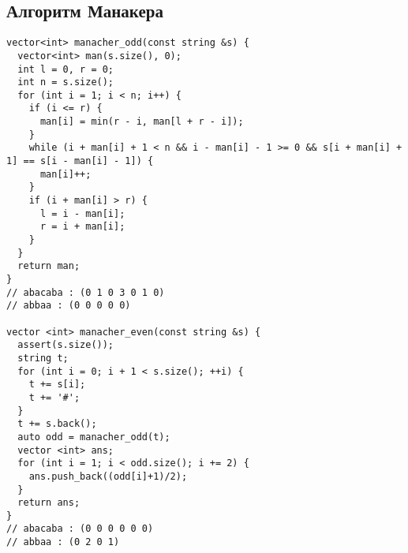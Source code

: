 \subsection{Алгоритм Манакера}
\begin{lstlisting}
vector<int> manacher_odd(const string &s) {
  vector<int> man(s.size(), 0);
  int l = 0, r = 0;
  int n = s.size();
  for (int i = 1; i < n; i++) {
    if (i <= r) {
      man[i] = min(r - i, man[l + r - i]);
    }
    while (i + man[i] + 1 < n && i - man[i] - 1 >= 0 && s[i + man[i] + 1] == s[i - man[i] - 1]) {
      man[i]++;
    }
    if (i + man[i] > r) {
      l = i - man[i];
      r = i + man[i];
    }
  }
  return man;
}
// abacaba : (0 1 0 3 0 1 0)
// abbaa : (0 0 0 0 0)

vector <int> manacher_even(const string &s) {
  assert(s.size());
  string t;
  for (int i = 0; i + 1 < s.size(); ++i) {
    t += s[i];
    t += '#';
  }
  t += s.back();
  auto odd = manacher_odd(t);
  vector <int> ans;
  for (int i = 1; i < odd.size(); i += 2) {
    ans.push_back((odd[i]+1)/2);
  }
  return ans;
}
// abacaba : (0 0 0 0 0 0)
// abbaa : (0 2 0 1)
\end{lstlisting}
